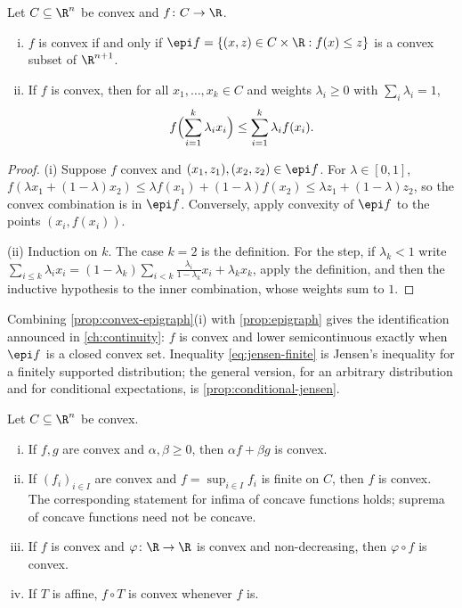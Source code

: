 \begin{proposition}\label{prop:convex-epigraph}
	Let $C\subseteq\R^n$ be convex and $f\colon C\to\R$.
	\begin{enumerate}[(i)]
		\item $f$ is convex if and only if $\epi f=\{(x,z)\in C\times\R : f(x)\leq z\}$
		      is a convex subset of $\R^{n+1}$.
		\item If $f$ is convex, then for all $x_1,\dots,x_k\in C$ and weights
		      $\lambda_i\geq0$ with $\sum_i\lambda_i=1$,
		      \begin{equation}\label{eq:jensen-finite}
			      f\Bigl(\sum_{i=1}^{k}\lambda_ix_i\Bigr)\leq\sum_{i=1}^{k}\lambda_if(x_i).
		      \end{equation}
	\end{enumerate}
\end{proposition}

\begin{proof}
	(i) Suppose $f$ convex and $(x_1,z_1),(x_2,z_2)\in\epi f$. For
	$\lambda\in[0,1]$,
	$f(\lambda x_1+(1-\lambda)x_2)\leq\lambda f(x_1)+(1-\lambda)f(x_2)
		\leq\lambda z_1+(1-\lambda)z_2$, so the convex combination is in $\epi f$.
	Conversely, apply convexity of $\epi f$ to the points $(x_i,f(x_i))$.

	(ii) Induction on $k$. The case $k=2$ is the definition. For the step, if
	$\lambda_k<1$ write $\sum_{i\leq k}\lambda_ix_i
		=(1-\lambda_k)\sum_{i<k}\frac{\lambda_i}{1-\lambda_k}x_i+\lambda_kx_k$, apply
	the definition, and then the inductive hypothesis to the inner combination,
	whose weights sum to $1$.
\end{proof}

Combining \autoref{prop:convex-epigraph}(i) with \autoref{prop:epigraph} gives
the identification announced in \autoref{ch:continuity}: $f$ is convex and lower
semicontinuous exactly when $\epi f$ is a closed convex set. Inequality
\eqref{eq:jensen-finite} is Jensen's inequality for a finitely supported
distribution; the general version, for an arbitrary distribution and for
conditional expectations, is \autoref{prop:conditional-jensen}.

\begin{proposition}[Operations]\label{prop:convex-function-operations}
	Let $C\subseteq\R^n$ be convex.
	\begin{enumerate}[(i)]
		\item If $f,g$ are convex and $\alpha,\beta\geq0$, then $\alpha f+\beta g$ is
		      convex.
		\item If $(f_i)_{i\in I}$ are convex and $f=\sup_{i\in I}f_i$ is finite on
		      $C$, then $f$ is convex. The corresponding statement for infima of concave
		      functions holds; suprema of concave functions need not be concave.
		\item If $f$ is convex and $\varphi\colon\R\to\R$ is convex and
		      non-decreasing, then $\varphi\circ f$ is convex.
		\item If $T$ is affine, $f\circ T$ is convex whenever $f$ is.
	\end{enumerate}
\end{proposition}

